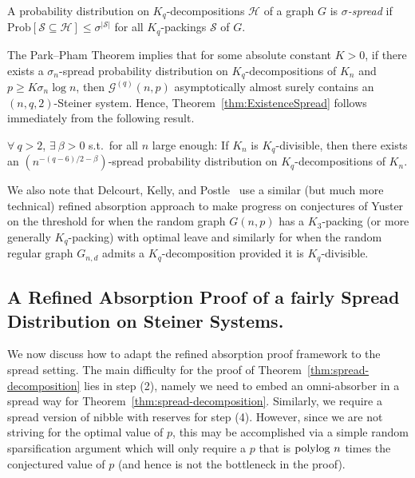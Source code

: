 \documentclass[twoside,leqno]{article}
\begin{document}
\begin{definition}
    A probability distribution on $K_q$-decompositions $\mathcal{H}$ of a graph $G$ is \textit{$\sigma$-spread} if $\text{Prob}[\mathcal{S} \subseteq \mathcal{H}] \leq \sigma^{|\mathcal{S}|}$  for all $K_q$-packings $\mathcal{S}$ of $G$.
\end{definition}

The Park--Pham Theorem implies that for some absolute constant $K > 0$, if there exists a $\sigma_n$-spread probability distribution on $K_q$-decompositions of $K_n$ and $p \geq K\sigma_n\log n$, then $\mathcal{G}^{(q)}(n, p)$ asymptotically almost surely contains an $(n, q, 2)$-Steiner system.  Hence, Theorem~\ref{thm:ExistenceSpread} follows immediately from the following result.

\begin{thm}\label{thm:spread-decomposition}
$\forall~q > 2$, $\exists~\beta > 0$ s.t.~for all $n$ large enough: If $K_n$ is $K_q$-divisible, then there exists an $\left(n^{-(q - 6)/2 - \beta}\right)$-spread probability distribution on $K_q$-decompositions of $K_n$.
\end{thm}

We also note that Delcourt, Kelly, and Postle~\cite{DKPIII} use a similar (but much more technical) refined absorption approach to make progress on conjectures of Yuster on the threshold for when the random graph $G(n,p)$ has a $K_3$-packing (or more generally $K_q$-packing) with optimal leave and similarly for when the random regular graph $G_{n,d}$ admits a $K_q$-decomposition provided it is $K_q$-divisible.  

\subsection{A Refined Absorption Proof of a fairly Spread Distribution on Steiner Systems.}

We now discuss how to adapt the refined absorption proof framework to the spread setting. The main difficulty for the proof of Theorem~\ref{thm:spread-decomposition} lies in step (2), namely we need to embed an omni-absorber in a spread way for Theorem~\ref{thm:spread-decomposition}. Similarly, we require a spread version of nibble with reserves for step (4). However, since we are not striving for the optimal value of $p$, this may be accomplished via a simple random sparsification argument which will only require a $p$ that is ${\rm polylog}~n$ times the conjectured value of $p$ (and hence is not the bottleneck in the proof).
\end{document}
